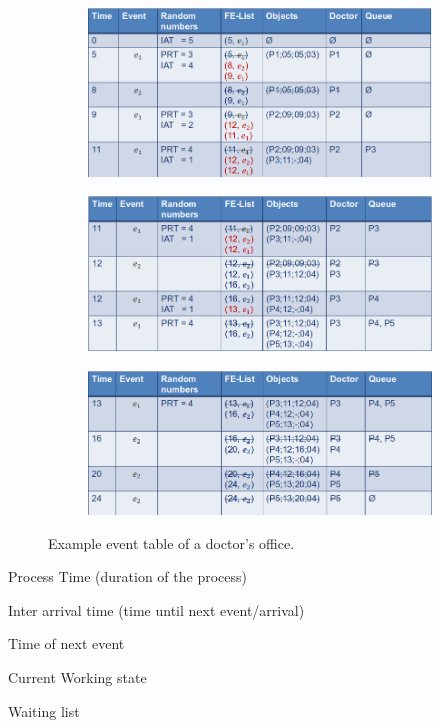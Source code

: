 \begin{figure}[H]
	\begin{subfigure}{\textwidth}
		\centering
		\includegraphics[width=.8\textwidth]{figures/DEMech1.png}
	\end{subfigure}
	\begin{subfigure}{\textwidth}
		\centering
		\includegraphics[width=.8\textwidth]{figures/DEMech2.png}
	\end{subfigure}
	\begin{subfigure}{\textwidth}
		\centering
		\includegraphics[width=.8\textwidth]{figures/DEMech3.png}
	\end{subfigure}
	\caption{Example event table of a doctor's office.}
\end{figure}

\begin{description}
	\tightlist
	\item [PRT] Process Time (duration of the process)
	\item [IAT] Inter arrival time (time until next event/arrival)
	\item [FE-List] Time of next event
	\item [Objects] Current Working state
	\item [Queue] Waiting list
\end{description}

